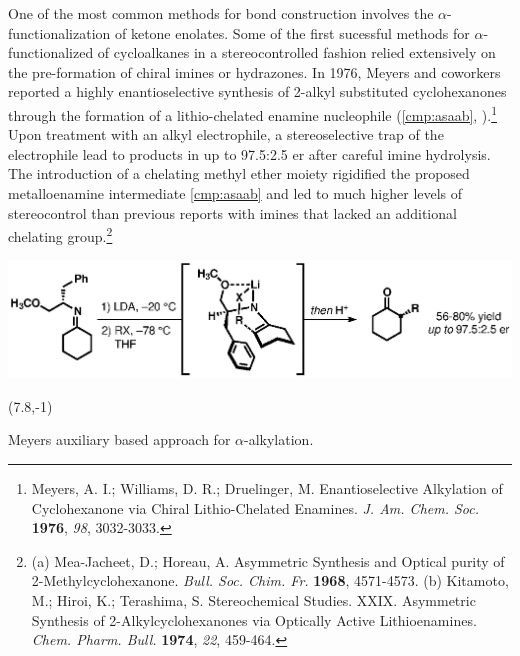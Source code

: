  One of the most common methods for  bond construction involves the
 $\alpha$-functionalization of ketone enolates.
 Some of the first sucessful methods for $\alpha$-functionalized of cycloalkanes in a
 stereocontrolled fashion relied extensively on the pre-formation of chiral imines or hydrazones. In
 1976, Meyers and coworkers reported a highly enantioselective synthesis of 2-alkyl substituted
 cyclohexanones through the formation of a lithio-chelated enamine
 nucleophile (\ref{cmp:asaab}, ).\footnote{{\frenchspacing Meyers, A. I.;
 Williams, D.
 R.; Druelinger, M.
 Enantioselective Alkylation of Cyclohexanone via Chiral Lithio-Chelated Enamines. \textit{J. Am.
 Chem. Soc.} \textbf{1976}, \textit{98}, 3032-3033.}} Upon treatment with an alkyl electrophile,
 a stereoselective trap of the electrophile lead to products in up to 97.5:2.5 er
 after careful imine hydrolysis.
 The introduction of a chelating methyl ether moiety rigidified the proposed metalloenamine
 intermediate \ref{cmp:asaab} and led to much higher levels of stereocontrol than previous reports
 with imines that lacked an additional chelating group.\footnote{(a) {\frenchspacing Mea-Jacheet, D.; Horeau, A. Asymmetric Synthesis and Optical purity of 2-Methylcyclohexanone. \textit{Bull. Soc. Chim. Fr.} \textbf{1968}, 4571-4573.} (b) {\frenchspacing Kitamoto, M.; Hiroi, K.; Terashima, S.
 Stereochemical Studies. XXIX. Asymmetric Synthesis of 2-Alkylcyclohexanones via Optically Active
 Lithioenamines. \textit{Chem. Pharm. Bull.} \textbf{1974}, \textit{22}, 459-464.}} 
  \begin{Scheme}[h]
  \centering
  \includegraphics[scale=0.8]{chp_asymmetric/images/meyers}
  \begin{textblock}{1}(7.8,-1)  \end{textblock}
  \caption{Meyers auxiliary based approach for $\alpha$-alkylation.}
  \label{sch:asmeyers}
\end{Scheme}   
 
